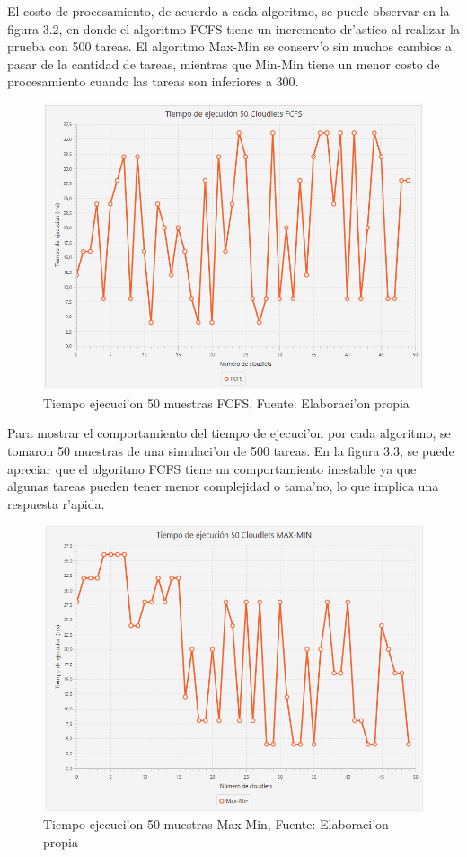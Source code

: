 El costo de procesamiento, de acuerdo a cada algoritmo, se puede observar en la figura 3.2, en donde el algoritmo FCFS tiene un incremento dr'astico al realizar la prueba con 500 tareas. El algoritmo Max-Min se conserv'o sin muchos cambios a pasar de la cantidad de tareas, mientras que Min-Min tiene un menor costo de procesamiento cuando las tareas son inferiores a 300.

\vspace{20em} 

\begin{figure}[H] 
	\caption{Tiempo ejecuci'on 50 muestras FCFS, Fuente: Elaboraci'on propia}
	\centering
	\includegraphics[scale=0.5]{media/fcfs}
\end{figure}


Para mostrar el comportamiento del tiempo de ejecuci'on por cada algoritmo, se tomaron 50 muestras de una simulaci'on de 500 tareas. En la figura 3.3, se puede apreciar que el algoritmo FCFS tiene un comportamiento inestable ya que algunas tareas pueden tener menor complejidad o tama'no, lo que implica una respuesta r'apida.

\begin{figure}[H] 
	\caption{Tiempo ejecuci'on 50 muestras Max-Min, Fuente: Elaboraci'on propia}
	\centering
	\includegraphics[scale=0.5]{media/max-min}
\end{figure}


